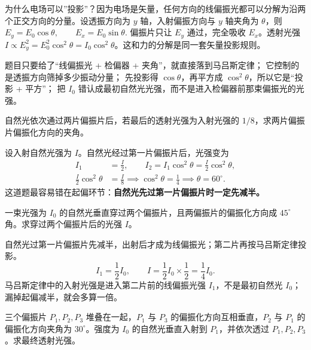 \documentclass[lang=cn,11pt]{elegantbook}
\begin{document}
\begin{remark}
为什么电场可以”投影”？因为电场是矢量，任何方向的线偏振光都可以分解为沿两个正交方向的分量。设透振方向为 \(y\) 轴，入射偏振方向与 \(y\) 轴夹角为 \(\theta\)，则
 \(E_y=E_0\cos\theta,\qquad E_x=E_0\sin\theta.\) 
偏振片只让 \(E_y\) 通过，完全吸收 \(E_x\)。透射光强 \(I\propto E_y^2=E_0^2\cos^2\theta=I_0\cos^2\theta\)。这和力的分解是同一套矢量投影规则。
\end{remark}

\begin{note}
 题目只要给了“线偏振光 + 检偏器 + 夹角”，就直接落到马吕斯定律； 它控制的是透振方向筛掉多少振动分量； 先投影得 \(\cos\theta\)，再平方成 \(\cos^2\theta\)，所以它是“投影 + 平方”； 把 \(I_0\) 错认成最初自然光光强，而不是进入检偏器前那束偏振光的光强。
\end{note}

\begin{exercise}[两片偏振片]
自然光依次通过两片偏振片后，若最后的透射光强为入射光强的 \(1/8\)，求两片偏振片偏振化方向的夹角。
\end{exercise}

\begin{solution}
设入射自然光强为 \(I\)。自然光经过第一片偏振片后，光强变为
\[
\begin{aligned}
I_1&=\frac{I}{2},\qquad
I_2=I_1\cos^2\theta=\frac{I}{2}\cos^2\theta,\\
\frac{I}{2}\cos^2\theta&=\frac{I}{8}
\implies \cos^2\theta=\frac14
\implies \theta=60^\circ.
\end{aligned}
\]
这道题最容易错在起偏环节：\textbf{自然光先过第一片偏振片时一定先减半。}
\end{solution}

\begin{exercise}
一束光强为 \(I_0\) 的自然光垂直穿过两个偏振片，且两偏振片的偏振化方向成 \(45^\circ\) 角。求穿过两个偏振片后的光强 \(I\)。
\end{exercise}

\begin{solution}
自然光过第一片偏振片先减半，出射后才成为线偏振光；第二片再按马吕斯定律投影。
\[
I_1=\frac12 I_0,\qquad
I=\frac12 I_0\times \frac12
=\frac14 I_0.
\]
马吕斯定律中的入射光强是进入第二片前的线偏振光强 \(I_1\)，不是最初自然光 \(I_0\)；漏掉起偏减半，就会多算一倍。
\end{solution}

\begin{exercise}
三个偏振片 \(P_1,P_2,P_3\) 堆叠在一起，\(P_1\) 与 \(P_3\) 的偏振化方向互相垂直，\(P_2\) 与 \(P_1\) 的偏振化方向夹角为 \(30^\circ\)。强度为 \(I_0\) 的自然光垂直入射到 \(P_1\)，并依次透过 \(P_1,P_2,P_3\)。求最终透射光强。
\end{exercise}
\end{document}
